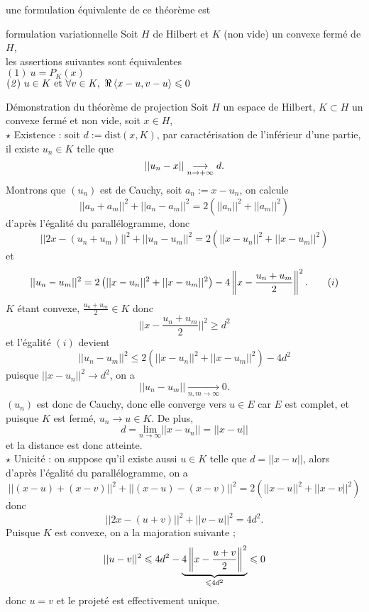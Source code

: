 \documentclass[a4paper,11pt, twoside]{article}
\begin{document}
une formulation équivalente de ce théorème est 


\begin{thC}{formulation variationnelle}
  Soit $H$ de Hilbert et $K$ (non vide) un convexe fermé de $H$,\\

  les assertions suivantes sont équivalentes\\
  $(\mathit 1)\ u=P_K(x)$\\
  $(\mathit 2)\ u\in K\text{ et }\forall v\in K,\ \Re\left\langle x-u,v-u \right\rangle\leqslant 0$
\end{thC}


\begin{ProofC}{Démonstration du théorème de projection}
  Soit $H$ un espace de Hilbert, $K\subset H$ un convexe fermé et non vide, soit $x\in H$,\\

  $\star$ Existence : soit $d:=\mathrm{dist}(x,K)$, par caractérisation de l'inférieur d'une partie, il existe $u_n\in K$ telle que 
  $$||u_n-x||\underset{n\to+\infty}{\longrightarrow} d.$$
  Montrons que $(u_n)$ est de Cauchy, soit $a_n:=x-u_n$, on calcule
  $$||a_n+a_m||^2+||a_n-a_m||^2=2\left(||a_n||^2+||a_m||^2\right)$$
  d'après l'égalité du parallélogramme, donc 
  $$||2x-(u_n+u_m)||^2+||u_n-u_m||^2=2\left(||x-u_n||^2+||x-u_m||^2\right)$$
  et 
  $$||u_n-u_m||^2=2\left(||x-u_n||^2+||x-u_m||^2\right)-4\left\lVert x-\frac{u_n+u_m}{2}\right\rVert^2.\qquad (i)$$
  $K$ étant convexe, $\displaystyle\frac{u_n+u_m}{2}\in K$ donc 
  $$||x-\frac{u_n+u_m}{2}||^2\geqslant d^2$$
  et l'égalité $(i)$ devient 
  $$||u_n-u_m||^2\leqslant2\left(||x-u_n||^2+||x-u_m||^2\right)-4d^2$$
  puisque $||x-u_n||^2\longrightarrow d^2$, on a 
  $$||u_n-u_m||\underset{n,m\to\infty}{\longrightarrow}0.$$
  $(u_n)$ est donc de Cauchy, donc elle converge vers $u\in E$ car $E$ est complet, et puisque $K$ est fermé, $u_n\longrightarrow u\in K$. De plus, 
  $$d=\underset{n\to\infty}{\mathrm{lim}}||x-u_n||=||x-u||$$
  et la distance est donc atteinte.\\

  $\star$ Unicité : on suppose qu'il existe aussi $u\in K$ telle que $d=||x-u||$, alors d'après l'égalité du parallélogramme, on a 
  $$||(x-u)+(x-v)||^2+||(x-u)-(x-v)||^2=2\left(||x-u||^2+||x-v||^2\right)$$
  donc 
  $$||2x-(u+v)||^2+||v-u||^2=4d^2.$$
  Puisque $K$ est convexe, on a la majoration suivante ;
  $$||u-v||^2\leqslant 4d^2-\underbrace{4\left\lVert x-\frac{u+v}{2}\right\rVert^2}_{\leqslant 4d^2}\leqslant 0$$
  donc $u=v$ et le projeté est effectivement unique.
\end{ProofC}
\end{document}
